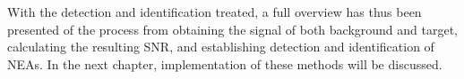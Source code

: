 With the detection and identification treated, a full overview has thus been presented of the process from obtaining the signal of both background and target, calculating the resulting SNR, and establishing detection and identification of NEAs. In the next chapter, implementation of these methods will be discussed.
